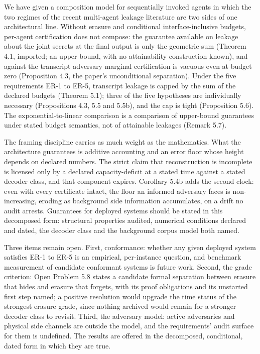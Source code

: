 \documentclass[
  11pt,
]{article}
\begin{document}
We have given a composition model for sequentially invoked agents in
which the two regimes of the recent multi-agent leakage literature are
two sides of one architectural line. Without erasure and conditional
interface-inclusive budgets, per-agent certification does not compose:
the guarantee available on leakage about the joint secrets at the final
output is only the geometric sum (Theorem 4.1, imported; an upper bound,
with no attainability construction known), and against the transcript
adversary marginal certification is vacuous even at budget zero
(Proposition 4.3, the paper's unconditional separation). Under the five
requirements ER-1 to ER-5, transcript leakage is capped by the sum of
the declared budgets (Theorem 5.1); three of the five hypotheses are
individually necessary (Propositions 4.3, 5.5 and 5.5b), and the cap is
tight (Proposition 5.6). The exponential-to-linear comparison is a
comparison of upper-bound guarantees under stated budget semantics, not
of attainable leakages (Remark 5.7).

The framing discipline carries as much weight as the mathematics. What
the architecture guarantees is additive accounting and an error floor
whose height depends on declared numbers. The strict claim that
reconstruction is incomplete is licensed only by a declared
capacity-deficit at a stated time against a stated decoder class, and
that component expires. Corollary 5.4b adds the second clock: even with
every certificate intact, the floor an informed adversary faces is
non-increasing, eroding as background side information accumulates, on a
drift no audit arrests. Guarantees for deployed systems should be stated
in this decomposed form: structural properties audited, numerical
conditions declared and dated, the decoder class and the background
corpus model both named.

Three items remain open. First, conformance: whether any given deployed
system satisfies ER-1 to ER-5 is an empirical, per-instance question,
and benchmark measurement of candidate conformant systems is future
work. Second, the grade criterion: Open Problem 5.8 states a candidate
formal separation between erasure that hides and erasure that forgets,
with its proof obligations and its unstarted first step named; a
positive resolution would upgrade the time status of the strongest
erasure grade, since nothing archived would remain for a stronger
decoder class to revisit. Third, the adversary model: active adversaries
and physical side channels are outside the model, and the requirements'
audit surface for them is undefined. The results are offered in the
decomposed, conditional, dated form in which they are true.
\end{document}
